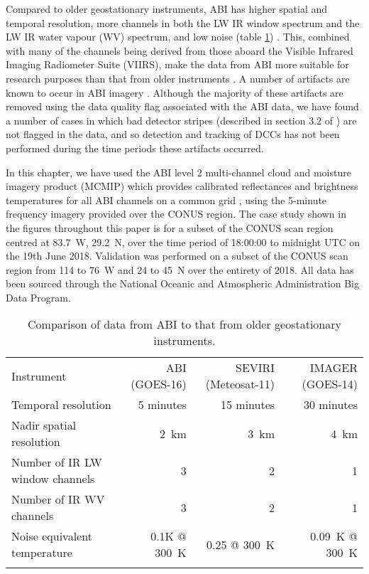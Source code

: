 Compared to older geostationary instruments, ABI has higher spatial and temporal resolution, more channels in both the LW IR window spectrum and the LW IR water vapour (WV) spectrum, and low noise (table \ref{table:abi_comparison}) \citep{iacovazzi_goes-16_2020}.
This, combined with many of the channels being derived from those aboard the Visible Infrared Imaging Radiometer Suite (VIIRS), make the data from ABI more suitable for research purposes than that from older instruments \citep{heidinger_chapter_2020}.
A number of artifacts are known to occur in ABI imagery \citep{gunshor_goes-r_2020}.
Although the majority of these artifacts are removed using the data quality flag associated with the ABI data, we have found a number of cases in which bad detector stripes (described in section 3.2 of \citet{gunshor_goes-r_2020}) are not flagged in the data, and so detection and tracking of DCCs has not been performed during the time periods these artifacts occurred.

In this chapter, we have used the ABI level 2 multi-channel cloud and moisture imagery product (MCMIP) which provides calibrated reflectances and brightness temperatures for all ABI channels on a common grid \citep{schmit_chapter_2020}, using the 5-minute frequency imagery provided over the CONUS region.
The case study shown in the figures throughout this paper is for a subset of the CONUS scan region centred at 83.7\textdegree~W, 29.2\textdegree~N, over the time period of 18:00:00 to midnight UTC on the 19th June 2018.
Validation was performed on a subset of the CONUS scan region from 114 to 76\textdegree~W and 24 to 45\textdegree~N over the entirety of 2018.
All data has been sourced through the National Oceanic and Atmospheric Administration Big Data Program.

\begin{center}
\begin{table}[t]
\caption{}
\label{table:abi_comparison}
\begin{tabular}{lrrr}
\tophline
Instrument                      & ABI (GOES-16) & SEVIRI (Meteosat-11) & IMAGER (GOES-14) \\
\middlehline
Temporal resolution             & 5 minutes     & 15 minutes   & 30 minutes       \\
Nadir spatial resolution        & 2~km          & 3~km         & 4~km             \\
Number of IR LW window channels & 3             & 2            & 1                \\
Number of IR WV channels        & 3             & 2            & 1                \\
Noise equivalent temperature    & 0.1K @ 300~K  & 0.25 @ 300~K & 0.09~K @ 300~K       \\
\bottomhline
\end{tabular}
\caption{Comparison of data from ABI to that from older geostationary instruments.} %
\end{table}
\end{center}

